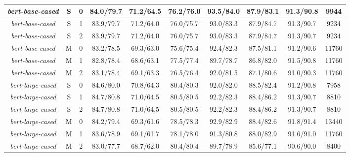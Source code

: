 \begin{table*}
{\begin{tabular}{|c|c|c||c|c|c|c|c|c||c|}
\textit{bert-base-cased} & S & 0 & 84.0/79.7 & 71.2/64.5 & 76.2/76.0 & 93.5/84.0 & 87.9/83.1 & 91.3/90.8 & 9944 \\ \hline
\textit{bert-base-cased} & S & 1 & 83.9/79.7 & 71.2/64.0 & 76.0/75.7 & 93.0/83.3 & 87.9/84.7 & 91.3/90.7 & 9234 \\ \hline
\textit{bert-base-cased} & S & 2 & 83.9/79.7 & 71.2/64.0 & 76.0/75.7 & 93.0/83.3 & 87.9/84.7 & 91.3/90.7 & 9234 \\ \hline
\textit{bert-base-cased} & M & 0 & 83.2/78.5 & 69.3/63.0 & 75.6/75.4 & 92.4/82.3 & 87.5/81.1 & 91.2/90.6 & 11760 \\ \hline
\textit{bert-base-cased} & M & 1 & 82.8/78.4 & 68.6/63.1 & 77.5/77.4 & 89.7/78.7 & 86.8/82.0 & 91.5/90.8 & 11760 \\ \hline
\textit{bert-base-cased} & M & 2 & 83.1/78.4 & 69.1/63.3 & 76.5/76.4 & 92.0/81.5 & 87.1/80.6 & 91.0/90.3 & 11760 \\ \hline
\textit{bert-large-cased} & S & 0 & 84.6/80.0 & 70.8/64.3 & 80.4/80.3 & 92.0/82.0 & 88.5/82.4 & 91.2/90.8 & 7958 \\ \hline
\textit{bert-large-cased} & S & 1 & 84.7/80.8 & 71.0/64.5 & 80.5/80.5 & 92.2/82.3 & 88.4/86.2 & 91.3/90.7 & 8810 \\ \hline
\textit{bert-large-cased} & S & 2 & 84.7/80.8 & 71.0/64.5 & 80.5/80.5 & 92.2/82.3 & 88.4/86.2 & 91.3/90.7 & 8810 \\ \hline
\textit{bert-large-cased} & M & 0 & 84.2/79.4 & 69.3/61.6 & 78.5/78.3 & 92.9/82.9 & 88.4/82.6 & 91.8/91.4 & 13440 \\ \hline
\textit{bert-large-cased} & M & 1 & 83.6/78.9 & 69.1/61.7 & 78.1/78.0 & 91.3/80.8 & 88.0/82.9 & 91.6/91.0 & 11760 \\ \hline
\textit{bert-large-cased} & M & 2 & 83.0/77.7 & 68.7/62.0 & 80.4/80.4 & 89.7/78.9 & 85.6/77.1 & 90.6/90.0 & 8400 \\ \hline
\end{tabular}}
\end{table*}

